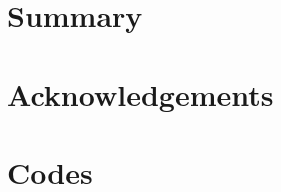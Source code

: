 \documentclass[11pt]{amsart}
\begin{document}
\section{Summary}


\section*{Acknowledgements}

\section*{Codes}



\end{document}
